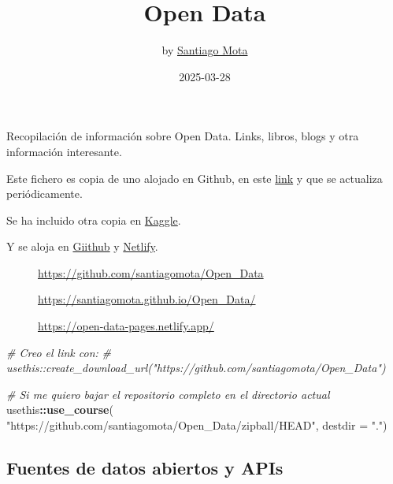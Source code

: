 \documentclass[
]{article}
\title{Open Data}
\author{by \href{https://www.linkedin.com/in/santiagomota/}{Santiago
Mota}}
\date{2025-03-28}
\newenvironment{Shaded}{\begin{snugshade}}{\end{snugshade}}
\newcommand{\AttributeTok}[1]{\textcolor[rgb]{0.13,0.29,0.53}{#1}}
\newcommand{\CommentTok}[1]{\textcolor[rgb]{0.56,0.35,0.01}{\textit{#1}}}
\newcommand{\FunctionTok}[1]{\textcolor[rgb]{0.13,0.29,0.53}{\textbf{#1}}}
\newcommand{\NormalTok}[1]{#1}
\newcommand{\SpecialCharTok}[1]{\textcolor[rgb]{0.81,0.36,0.00}{\textbf{#1}}}
\newcommand{\StringTok}[1]{\textcolor[rgb]{0.31,0.60,0.02}{#1}}
\begin{document}
\maketitle

Recopilación de información sobre Open Data. Links, libros, blogs y otra
información interesante.

Este fichero es copia de uno alojado en Github, en este
\href{https://github.com/santiagomota/Open_Data}{link} y que se
actualiza periódicamente.

Se ha incluido otra copia en
\href{https://www.kaggle.com/code/santiagomota/open-data-links/}{Kaggle}.

Y se aloja en \href{https://santiagomota.github.io/Open_Data/}{Giithub}
y \href{https://open-data-pages.netlify.app/}{Netlify}.

\begin{figure}
\centering

\caption{\url{https://github.com/santiagomota/Open_Data}}
\end{figure}

\begin{figure}
\centering

\caption{\url{https://santiagomota.github.io/Open_Data/}}
\end{figure}

\begin{figure}
\centering

\caption{\url{https://open-data-pages.netlify.app/}}
\end{figure}

\begin{Shaded}
\begin{Highlighting}[]
\CommentTok{\# Creo el link con: }
\CommentTok{\# usethis::create\_download\_url("https://github.com/santiagomota/Open\_Data")}

\CommentTok{\# Si me quiero bajar el repositorio completo en el directorio actual}
\NormalTok{usethis}\SpecialCharTok{::}\FunctionTok{use\_course}\NormalTok{(}
    \StringTok{"https://github.com/santiagomota/Open\_Data/zipball/HEAD"}\NormalTok{, }\AttributeTok{destdir =} \StringTok{"."}\NormalTok{)}
\end{Highlighting}
\end{Shaded}

\subsection{Fuentes de datos abiertos y
APIs}\label{fuentes-de-datos-abiertos-y-apis}
\end{document}
